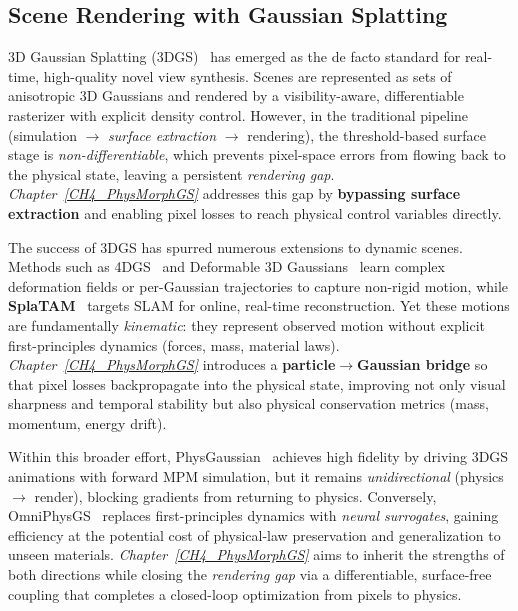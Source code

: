 \subsection{Scene Rendering with Gaussian Splatting}
    3D Gaussian Splatting (3DGS)~\citep{kerbl20233d} has emerged as the de facto standard for real-time, high-quality novel view synthesis. Scenes are represented as sets of anisotropic 3D Gaussians and rendered by a visibility-aware, differentiable rasterizer with explicit density control. However, in the traditional pipeline (simulation $\rightarrow$ \emph{surface extraction} $\rightarrow$ rendering), the threshold-based surface stage is \emph{non-differentiable}, which prevents pixel-space errors from flowing back to the physical state, leaving a persistent \emph{rendering gap}. \emph{Chapter~\ref{CH4_PhysMorphGS}} addresses this gap by \textbf{bypassing surface extraction} and enabling pixel losses to reach physical control variables directly.
    
    The success of 3DGS has spurred numerous extensions to dynamic scenes. Methods such as 4DGS~\citep{wu20244dgaussiansplattingrealtime} and Deformable 3D Gaussians~\citep{yang2023deformable3dgaussianshighfidelity} learn complex deformation fields or per-Gaussian trajectories to capture non-rigid motion, while \textbf{SplaTAM}~\citep{keetha2024splatam} targets SLAM for online, real-time reconstruction. Yet these motions are fundamentally \emph{kinematic}: they represent observed motion without explicit first-principles dynamics (forces, mass, material laws). \emph{Chapter~\ref{CH4_PhysMorphGS}} introduces a \textbf{particle$\rightarrow$Gaussian bridge} so that pixel losses backpropagate into the physical state, improving not only visual sharpness and temporal stability but also physical conservation metrics (mass, momentum, energy drift).
    
    Within this broader effort, PhysGaussian~\citep{xie2024physgaussian} achieves high fidelity by driving 3DGS animations with forward MPM simulation, but it remains \emph{unidirectional} (physics $\rightarrow$ render), blocking gradients from returning to physics. Conversely, OmniPhysGS~\citep{lin2025omniphysgs} replaces first-principles dynamics with \emph{neural surrogates}, gaining efficiency at the potential cost of physical-law preservation and generalization to unseen materials. \emph{Chapter~\ref{CH4_PhysMorphGS}} aims to inherit the strengths of both directions while closing the \emph{rendering gap} via a differentiable, surface-free coupling that completes a closed-loop optimization from pixels to physics.

